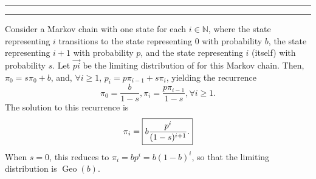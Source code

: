 \documentclass[11pt]{article}
\newcounter{questionCounter}
\newcounter{partCounter}[questionCounter]
\newenvironment{question}[2][\arabic{questionCounter}]{%
    \setcounter{partCounter}{0}%
    \vspace{.25in} \hrule \vspace{0.5em}%
        \noindent{\bf #2}%
    \vspace{0.8em} \hrule \vspace{.10in}%
    \addtocounter{questionCounter}{1}%
}{}
\newcommand{\Geo}{\operatorname{Geo}}
\begin{document}
\begin{question}{Problem 8.4}
Consider a Markov chain with one state for each $i \in \mathbb{N}$, where the
state representing $i$ transitions to the state representing $0$ with
probability $b$, the state representing $i + 1$ with probability $p$, and the
state representing $i$ (itself) with probability $s$. Let $\vec{pi}$ be the
limiting distribution of for this Markov chain. Then, $\pi_0 = s\pi_0 + b$,
and, $\forall i \geq 1$, $p_i = p\pi_{i - 1} + s\pi_i$,
yielding the recurrence
\[\pi_0 = \frac{b}{1 - s},
 \pi_i = \frac{p\pi_{i - 1}}{1 - s}, \forall i \geq 1.\]
The solution to this recurrence is
\[\pi_i = \mbox{\fbox{$\displaystyle b\frac{p^i}{(1 - s)^{i + 1}}$.}}\]
When $s = 0$, this reduces to $\pi_i = bp^i = b(1 - b)^i$, so that the limiting
distribution is $\Geo(b)$.
\end{question}
\end{document}
